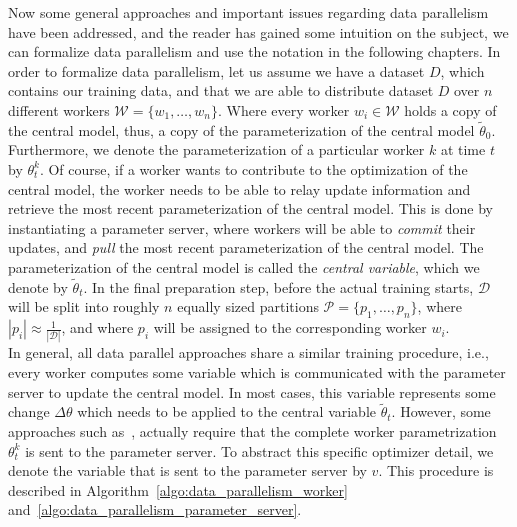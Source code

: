 \newpage

Now some general approaches and important issues regarding data parallelism have been addressed, and the reader has gained some intuition on the subject, we can formalize data parallelism and use the notation in the following chapters. In order to formalize data parallelism, let us assume we have a dataset $D$, which contains our training data, and that we are able to distribute dataset $D$ over $n$ different workers $\mathcal{W} = \{w_1, \ldots, w_n\}$. Where every worker $w_i \in \mathcal{W}$ holds a copy of the central model, thus, a copy of the parameterization of the central model $\tilde{\theta}_0$. Furthermore, we denote the parameterization of a particular worker $k$ at time $t$ by $\theta_t^k$. Of course, if a worker wants to contribute to the optimization of the central model, the worker needs to be able to relay update information and retrieve the most recent parameterization of the central model. This is done by instantiating a parameter server, where workers will be able to \emph{commit} their updates, and \emph{pull} the most recent parameterization of the central model. The parameterization of the central model is called the \emph{central variable}, which we denote by $\tilde{\theta}_t$. In the final preparation step, before the actual training starts, $\mathcal{D}$ will be split into roughly $n$ equally sized partitions $\mathcal{P} = \{p_1, \ldots, p_n\}$, where $\left\vert{p_i}\right\vert \approx \frac{1}{\left\vert{\mathcal{D}}\right\vert}$, and where $p_i$ will be assigned to the corresponding worker $w_i$.\\

In general, all data parallel approaches share a similar training procedure, i.e., every worker computes some variable which is communicated with the parameter server to update the central model. In most cases, this variable represents some change $\Delta\theta$ which needs to be applied to the central variable $\tilde{\theta}_t$. However, some approaches such as~\cite{zhang2015deep}, actually require that the complete worker parametrization $\theta^k_t$ is sent to the parameter server. To abstract this specific optimizer detail, we denote the variable that is sent to the parameter server by $v$. This procedure is described in Algorithm~\ref{algo:data_parallelism_worker} and~\ref{algo:data_parallelism_parameter_server}.

